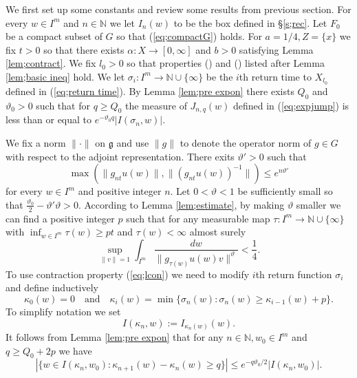 \documentclass[12pt]{amsart}
\theoremstyle{definition}
\theoremstyle{remark}
\numberwithin{equation}{section}
\begin{document}
We first set up some constants and review some results from previous section.
For every $w\in I^m$ and $n\in \mathbb N$ we let $I_n(w)$ to be the box defined in \S \ref{s;rec}.
Let $F_0$ be a compact subset of $G$ so that (\ref{eq;compactG}) holds.
 For  $a=1/4, Z=\{x\}$ we fix $t>0$ 
 so that  there exists $\alpha: X\to [0,\infty]$ and $b>0$ satisfying  Lemma \ref{lem;contract}. 
We fix $l_0>0$ so that properties ({}) and ({}) listed after Lemma \ref{lem;basic ineq} hold.
We let    $\sigma_i: I^m\to {\mathbb N}\cup \{\infty\}$
be the $i$th return time to $X_{l_0}$  defined in (\ref{eq;return time}).
By  Lemma \ref{lem;pre expon}
 there exists  $Q_0$ and $\vartheta_0>0$ such that
 for $q\ge Q_0$
  the measure of $J_{n,q}(w)$
 defined in (\ref{eq;expjump}) is less than or equal to $e^{-\vartheta_0q}|I(\sigma_n,w)|$. 

We fix a norm $\|\cdot\|$ on $\mathfrak g$ and use 
$\|g\|$ to denote the   operator norm of $g\in G$ with respect to
the adjoint representation. 
There exits $\vartheta'>0$ such that
\begin{equation}\label{eq;expgrow}
 \max{( \|g_{nt}u(w)\|, \|(g_{nt}u(w))^{-1}\|)}\le e^{n\vartheta'}
\end{equation}
for every $w\in I^m$ and positive integer  $n$. 
Let $0<\vartheta<1$ be sufficiently small so that $\frac{\vartheta_0}{2}-\vartheta'\vartheta>0$. 
According to Lemma \ref{lem;estimate}, by 
 making $\vartheta$ smaller we can find a positive integer $p$
 such that for any measurable map $\tau: I^m \to
{ \mathbb N}\cup\{\infty\}$ with $\inf_{w\in I^m} \tau(w) \ge pt$ and $\tau(w)<\infty$ almost surely 
\begin{equation}\label{eq;lcon}
\sup_{\|v\|=1}\int_{I^m}\frac{dw}{\|g_{\tau(w)}u(w)v\|^{\vartheta}}<\frac{1}{4}.
\end{equation}
To use contraction property (\ref{eq;lcon}) we need to modify $i$th return function $\sigma_i$ and define 
inductively 
\[
\kappa_0(w)=0\quad \mbox{and}\quad  \kappa_i(w)=\min\{\sigma_n(w): 
\sigma_n(w)\ge \kappa_{i-1}(w)+p\}.
\]
To simplify notation we set
\[
I(\kappa_n, w):= I_{\kappa_n(w)}(w).
\]
It follows from Lemma \ref{lem;pre expon} that for
any $n\in \mathbb N, w_0\in I^m$ and 
 $q\ge Q_0+2p$ we have
\begin{equation}\label{eq;lhard}
|\{w\in I(\kappa_n, w_0): \kappa_{n+1}(w)-\kappa_n(w)\ge q\}
|\le e^{-q\vartheta_0/2}|I(\kappa_n, w_0)|.
\end{equation}
\end{document}
